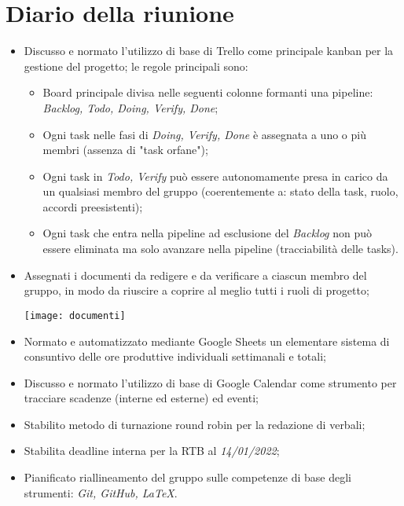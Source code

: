 \section{Diario della riunione}
\begin{itemize}
  \item Discusso e normato l'utilizzo di base di Trello come principale kanban per la gestione del progetto; le regole principali sono:
  \begin{itemize}
    \item Board principale divisa nelle seguenti colonne formanti una pipeline: \textit{Backlog, Todo, Doing, Verify, Done};
    \item Ogni task nelle fasi di \textit{Doing, Verify, Done} è assegnata a uno o più membri (assenza di "task orfane");
    \item Ogni task in \textit{Todo, Verify} può essere autonomamente presa in carico da un qualsiasi membro del gruppo (coerentemente a: stato della task, ruolo, accordi preesistenti);
    \item Ogni task che entra nella pipeline ad esclusione del \textit{Backlog} non può essere eliminata ma solo avanzare nella pipeline (tracciabilità delle tasks).
  \end{itemize}
  \item Assegnati i documenti da redigere e da verificare a ciascun membro del gruppo, in modo da riuscire a coprire al meglio tutti i ruoli di progetto;
  
\begin{center}
  \texttt{[image: documenti]}
\end{center}
  
  \item Normato e automatizzato mediante Google Sheets un elementare sistema di consuntivo delle ore produttive individuali settimanali e totali;
  \item Discusso e normato l'utilizzo di base di Google Calendar come strumento per tracciare scadenze (interne ed esterne) ed eventi;
  \item Stabilito metodo di turnazione round robin per la redazione di verbali;
  \item Stabilita deadline interna per la RTB al \textit{14/01/2022};
  \item Pianificato riallineamento del gruppo sulle competenze di base degli strumenti: \textit{Git, GitHub, LaTeX}.
\end{itemize}